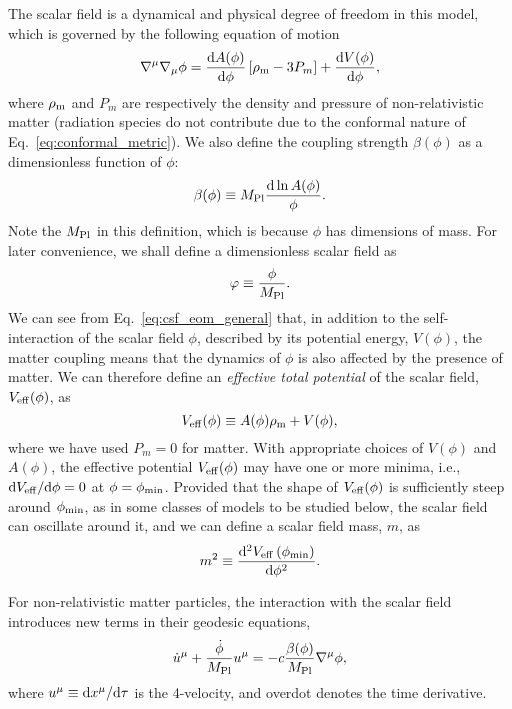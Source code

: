 The scalar field is a dynamical and physical degree of freedom in this model, which is governed by the following equation of motion
\begin{equation}\label{eq:csf_eom_general}
    \nabla^\mu\nabla_\mu\phi = \frac{{\rm d}A(\phi)}{{\rm d}\phi}\left[\rho_{\rm m}-3P_m\right] + \frac{{\rm d}V(\phi)}{{\rm d}\phi},
\end{equation}
where $\rho_{\rm m}$ and $P_m$ are respectively the density and pressure of non-relativistic matter (radiation species do not contribute due to the conformal nature of Eq.~\eqref{eq:conformal_metric}). We also define the coupling strength $\beta(\phi)$ as a dimensionless function of $\phi$:
\begin{equation}\label{eq:csf_beta_general}
    \beta(\phi) \equiv M_{\rm Pl}\frac{{\rm d}\ln A(\phi)}{\phi}.
\end{equation}
Note the $M_{\rm Pl}$ in this definition, which is because $\phi$ has dimensions of mass. For later convenience, we shall define a dimensionless scalar field as
\begin{equation}
    \varphi \equiv \frac{\phi}{M_{\rm Pl}}. 
\end{equation}
We can see from Eq.~\eqref{eq:csf_eom_general} that, in addition to the self-interaction of the scalar field $\phi$, described by its potential energy, $V(\phi)$, the matter coupling means that the dynamics of $\phi$ is also affected by the presence of matter. We can therefore define an \textit{effective total potential} of the scalar field, $V_{\rm eff}(\phi)$, as
\begin{equation}\label{eq:Veff}
    V_{\rm eff}(\phi) \equiv A(\phi)\rho_{\rm m} + V(\phi),
\end{equation}
where we have used $P_m=0$ for matter. With appropriate choices of $V(\phi)$ and $A(\phi)$, the effective potential $V_{\rm eff}(\phi)$ may have one or more minima, i.e., ${\rm d}V_{\rm eff}/{\rm d}\phi=0$ at $\phi=\phi_{\rm min}$. Provided that the shape of $V_{\rm eff}(\phi)$ is sufficiently steep around $\phi_{\rm min}$, as in some classes of models to be studied below, the scalar field can oscillate around it, and we can define a scalar field mass, $m$, as
\begin{equation}
    m^2 \equiv \frac{{\rm d}^2V_{\rm eff}\left(\phi_{\rm min}\right)}{{\rm d}\phi^2}.
\end{equation}

For non-relativistic matter particles, the interaction with the scalar field introduces new terms in their geodesic equations,
\begin{equation}\label{eq:csf_particle_geodesic_general}
    \dot{u}^\mu + \frac{\dot{\phi}}{M_{\rm Pl}}u^\mu = -c\frac{\beta(\phi)}{M_{\rm Pl}}\nabla^\mu\phi,
\end{equation}
where $u^\mu\equiv{\rm d}x^{\mu}/{\rm d}\tau$ is the 4-velocity, and overdot denotes the time derivative.

